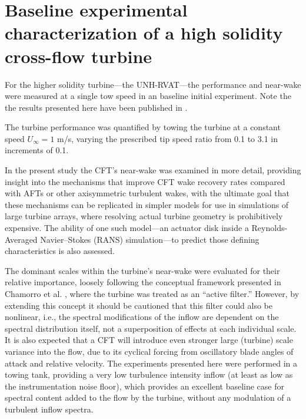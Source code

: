 \chapter{Baseline experimental characterization of a high solidity cross-flow
turbine}\label{chap:RVAT-baseline}

For the higher solidity turbine---the UNH-RVAT---the performance and near-wake
were measured at a single tow speed in an baseline initial experiment. Note the
the results presented here have been published in \cite{Bachant2013,
    Bachant2015-JoT}.

The turbine performance was quantified by towing the turbine at a constant speed
$U_\infty=1$ m/s, varying the prescribed tip speed ratio from 0.1 to 3.1 in
increments of 0.1.

In the present study the CFT's near-wake was examined in more detail, providing
insight into the mechanisms that improve CFT wake recovery rates compared with
AFTs or other axisymmetric turbulent wakes, with the ultimate goal that these
mechanisms can be replicated in simpler models for use in simulations of large
turbine arrays, where resolving actual turbine geometry is prohibitively
expensive. The ability of one such model---an actuator disk inside a
Reynolds-Averaged Navier--Stokes (RANS) simulation---to predict those defining
characteristics is also assessed.

The dominant scales within the turbine's near-wake were evaluated for their
relative importance, loosely following the conceptual framework presented in
Chamorro et al. \cite{Chamorro2012b}, where the turbine was treated as an
``active filter.'' However, by extending this concept it should be cautioned
that this filter could also be nonlinear, i.e., the spectral modifications of
the inflow are dependent on the spectral distribution itself, not a
superposition of effects at each individual scale. It is also expected that a
CFT will introduce even stronger large (turbine) scale variance into the flow,
due to its cyclical forcing from oscillatory blade angles of attack and relative
velocity. The experiments presented here were performed in a towing tank,
providing a very low turbulence intensity inflow (at least as low as the
instrumentation noise floor), which provides an excellent baseline case for
spectral content added to the flow by the turbine, without any modulation of a
turbulent inflow spectra.

